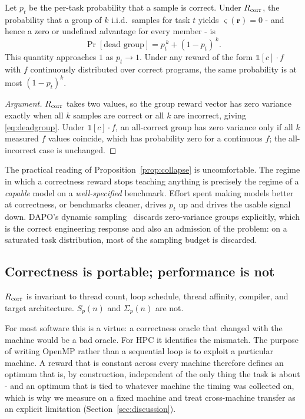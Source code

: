 \begin{proposition}
\label{prop:collapse}
Let $p_t$ be the per-task probability that a sample is correct. Under
$R_{\mathrm{corr}}$, the probability that a group of $k$ i.i.d.\ samples for task $t$
yields $\varsigma(\mathbf{r}) = 0$ - and hence a zero or undefined
advantage for every member - is
\begin{equation}
  \Pr[\text{dead group}] = p_t^{\,k} + (1-p_t)^{\,k}.
  \label{eq:deadgroup}
\end{equation}
This quantity approaches $1$ as $p_t \to 1$. Under any reward of the form
$\mathbb{1}[c]\cdot f$ with $f$ continuously distributed over correct programs,
the same probability is at most $(1-p_t)^k$.
\end{proposition}

\begin{proof}[Argument]
$R_{\mathrm{corr}}$ takes two values, so the group reward vector has zero variance exactly
when all $k$ samples are correct or all $k$ are incorrect, giving
\eqref{eq:deadgroup}. Under $\mathbb{1}[c]\cdot f$, an all-correct group has
zero variance only if all $k$ measured $f$ values coincide, which has
probability zero for a continuous $f$; the all-incorrect case is unchanged.
\end{proof}

The practical reading of Proposition~\ref{prop:collapse} is uncomfortable. The
regime in which a correctness reward stops teaching anything is precisely the
regime of a \emph{capable} model on a \emph{well-specified} benchmark. Effort
spent making models better at correctness, or benchmarks cleaner, drives $p_t$
up and drives the usable signal down. DAPO's dynamic sampling~\cite{dapo}
discards zero-variance groups explicitly, which is the correct engineering
response and also an admission of the problem: on a saturated task
distribution, most of the sampling budget is discarded.

\subsection{Correctness is portable; performance is not}

\begin{observation}
\label{obs:invariance}
$R_{\mathrm{corr}}$ is invariant to thread count, loop schedule, thread affinity,
compiler, and target architecture. $S_p(n)$ and $\Sigma_p(n)$ are not.
\end{observation}

For most software this is a virtue: a correctness oracle that changed with the
machine would be a bad oracle. For HPC it identifies the mismatch. The purpose
of writing OpenMP rather than a sequential loop is to exploit a particular
machine. A reward that is constant across every machine therefore defines an
optimum that is, by construction, independent of the only thing the task is
about - and an optimum that is tied to whatever machine the timing was collected
on, which is why we measure on a fixed machine and treat cross-machine transfer
as an explicit limitation (Section~\ref{sec:discussion}).


